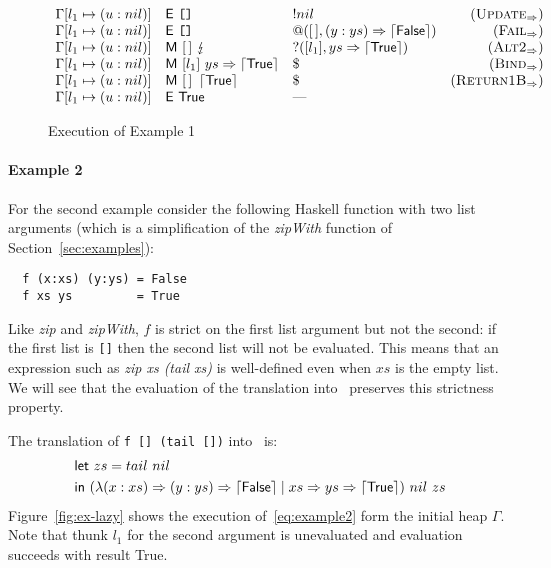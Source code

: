 \begin{figure*}
\[\begin{array}{lllr}
    \Gamma[l_1\mapsto(u : nil)]             & \textsf{E}~\texttt{[]}                                                & !nil                                       & (\textsc{Update}_{\Rightarrow})   \\
    \Gamma[l_1\mapsto(u : nil)]             & \textsf{E}~\texttt{[]}                                                & @([\,],(y : ys) \Rightarrow \left\lceil \textsf{False}\right\rceil)     & (\textsc{Fail}_{\Rightarrow})     \\
    \Gamma[l_1\mapsto(u : nil)]             & \textsf{M}~[\,]~\lightning                                   & ?([l_1],ys \Rightarrow \left\lceil \textsf{True}\right\rceil)           & (\textsc{Alt2}_{\Rightarrow})     \\
    \Gamma[l_1\mapsto(u : nil)]             & \textsf{M}~[l_1]~ys \Rightarrow \left\lceil \textsf{True}\right\rceil                     & \$                                         & (\textsc{Bind}_{\Rightarrow})     \\
    \Gamma[l_1\mapsto(u : nil)]             & \textsf{M}~[\,]~\left\lceil \textsf{True}\right\rceil                                     & \$                                         & (\textsc{Return1B}_{\Rightarrow})  \\
    \Gamma[l_1\mapsto(u : nil)]             & \textsf{E}~\textsf{True}                                               & \text{---}                                 &                        \\
  \end{array}
\]
\caption{Execution of Example 1}
\label{fig:ex-short}
\end{figure*}

\paragraph{Example 2}
For the second example consider the following Haskell function with
two list arguments (which is a simplification of the \textit{zipWith}
function of Section~\ref{sec:examples}):
\begin{verbatim}
  f (x:xs) (y:ys) = False
  f xs ys         = True
\end{verbatim}
%
Like \textit{zip} and \textit{zipWith}, $f$ is strict on the first list argument
but not the second: if the first list is \texttt{[]} then the second
list will not be evaluated.
This means that an expression such as \textit{zip xs (tail xs)} is
well-defined even when $xs$ is the empty list.
We will see that the evaluation of the
translation into \lambdaPMC\ preserves this strictness property.

The translation of \verb|f [] (tail [])| into \lambdaPMC\ is:
\begin{equation}
  \begin{split}
  &\textsf{let}~ zs = tail~nil \\
  &\textsf{in}~ (\lambda(x : xs) \Rightarrow (y : ys) \Rightarrow \left\lceil \textsf{False}\right\rceil \mid xs \Rightarrow ys \Rightarrow \left\lceil \textsf{True}\right\rceil)~nil~zs
  \end{split} \label{eq:example2}
\end{equation}
Figure~\ref{fig:ex-lazy} shows the execution of~\eqref{eq:example2}
form the initial heap $\Gamma$.  Note that thunk $l_1$ for the second
argument is unevaluated and evaluation succeeds with result
\textsf{True}.

